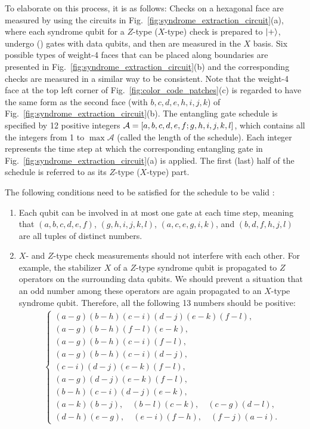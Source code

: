 \documentclass[
 prx,
 reprint,
 superscriptaddress,
 longbibliography,
 dvipsnames
]{revtex4-2}
\begin{document}
To elaborate on this process, it is as follows:
Checks on a hexagonal face are measured by using the circuits in Fig.~\ref{fig:syndrome_extraction_circuit}(a), where each syndrome qubit for a $Z$-type ($X$-type) check is prepared to $\ket{+}$, undergo \cz (\cnot) gates with data qubits, and then are measured in the $X$ basis.
Six possible types of weight-4 faces that can be placed along boundaries are presented in Fig.~\ref{fig:syndrome_extraction_circuit}(b) and the corresponding checks are measured in a similar way to be consistent.
Note that the weight-4 face at the top left corner of Fig.~\ref{fig:color_code_patches}(c) is regarded to have the same form as the second face (with $b, c, d, e, h, i, j, k$) of Fig.~\ref{fig:syndrome_extraction_circuit}(b).
The entangling gate schedule is specified by 12 positive integers $\mathcal{A} = \qty[a, b, c, d, e, f; g, h, i, j, k, l]$, which contains all the integers from 1 to $\max\mathcal{A}$ (called the length of the schedule).
Each integer represents the time step at which the corresponding entangling gate in Fig.~\ref{fig:syndrome_extraction_circuit}(a) is applied.
The first (last) half of the schedule is referred to as its $Z$-type ($X$-type) part.

The following conditions need to be satisfied for the schedule to be valid \cite{beverland2021cost}:
\begin{enumerate}
    \item Each qubit can be involved in at most one \cnot gate at each time step, meaning that $(a,b,c,d,e,f)$, $(g,h,i,j,k,l)$, $(a,c,e,g,i,k)$, and $(b,d,f,h,j,l)$ are all tuples of distinct numbers.
    \item $X$- and $Z$-type check measurements should not interfere with each other. For example, the stabilizer $X$ of a $Z$-type syndrome qubit is propagated to $Z$ operators on the surrounding data qubits. We should prevent a situation that an odd number among these operators are again propagated to an $X$-type syndrome qubit. Therefore, all the following 13 numbers should be positive: 
    \begin{align}
    \begin{cases}
        (a-g)(b-h)(c-i)(d-j)(e-k)(f-l), \\
        (a-g)(b-h)(f-l)(e-k), \\
        (a-g)(b-h)(c-i)(f-l), \\
        (a-g)(b-h)(c-i)(d-j), \\
        (c-i)(d-j)(e-k)(f-l), \\
        (a-g)(d-j)(e-k)(f-l), \\
        (b-h)(c-i)(d-j)(e-k), \\
        (a-k)(b-j), \quad (b-l)(c-k), \quad (c-g)(d-l), \\
        (d-h)(e-g), \quad (e-i)(f-h), \quad (f-j)(a-i).
    \end{cases} \label{eq:13_positive_numbers}
    \end{align}
\end{enumerate}
\end{document}
